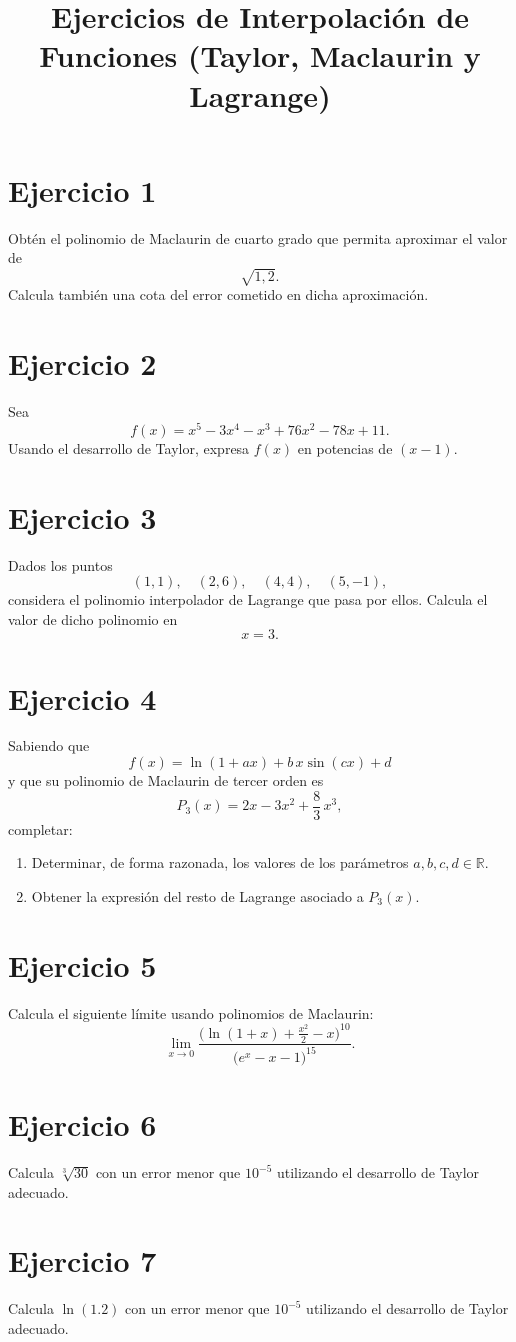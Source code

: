 \documentclass[12pt]{article}
\title{Ejercicios de Interpolación de Funciones (Taylor, Maclaurin y Lagrange)}
\author{}
\date{}
\begin{document}
\maketitle

\section*{Ejercicio 1}
Obtén el polinomio de Maclaurin de cuarto grado que permita aproximar el valor de
\[
\sqrt{1{,}2}.
\]
Calcula también una cota del error cometido en dicha aproximación.

\section*{Ejercicio 2}
Sea
\[
f(x)=x^{5}-3x^{4}-x^{3}+76x^{2}-78x+11.
\]
Usando el desarrollo de Taylor, expresa \(f(x)\) en potencias de \((x-1)\).

\section*{Ejercicio 3}
Dados los puntos
\[
(1,1),\quad (2,6),\quad (4,4),\quad (5,-1),
\]
considera el polinomio interpolador de Lagrange que pasa por ellos. Calcula el valor de dicho polinomio en
\[
x=3.
\]

\section*{Ejercicio 4}
Sabiendo que
\[
f(x)=\ln(1+ax)+b\,x\sin(cx)+d
\]
y que su polinomio de Maclaurin de tercer orden es
\[
P_3(x)=2x-3x^2+\frac{8}{3}\,x^3,
\]
completar:
\begin{enumerate}
  \item Determinar, de forma razonada, los valores de los parámetros \(a,b,c,d\in\mathbb{R}\).
  \item Obtener la expresión del resto de Lagrange asociado a \(P_3(x)\).
\end{enumerate}

\section*{Ejercicio 5}
Calcula el siguiente límite usando polinomios de Maclaurin:
\[
\lim_{x\to 0}\frac{\Big(\ln(1+x)+\frac{x^{2}}{2}-x\Big)^{10}}{\big(e^{x}-x-1\big)^{15}}.
\]

\section*{Ejercicio 6}
Calcula \(\sqrt[3]{30}\) con un error menor que \(10^{-5}\) utilizando el desarrollo de Taylor adecuado.

\section*{Ejercicio 7}
Calcula \(\ln(1.2)\) con un error menor que \(10^{-5}\) utilizando el desarrollo de Taylor adecuado.
\end{document}

